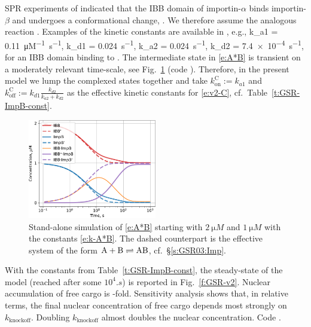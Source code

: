 \documentclass[12pt,notitlepage]{article}
\def\[#1\]{\begin{align}#1\end{align}}
\begin{document}
%

SPR experiments of \cite{Catimel2001}
indicated that
the IBB domain of importin-$\alpha$ 
binds importin-$\beta$
and undergoes a conformational change,
\[
	\label{e:A*B}
	.
\]
%
We therefore assume the analogous reaction
\[
	\label{e:Cargo*B}
	.
\]
%
%
Examples of the kinetic constants
are available in \cite[Table~I]{Catimel2001},
e.g.,
\[
	\label{e:k-A*B}
	k_{a1} = \SI{0.11}{\micro M^{-1} . s^{-1}},
	\quad
	k_{d1} = \SI{0.024}{s^{-1}},
	\qquad
	k_{a2} = \SI{0.024}{s^{-1}},
	\quad
	k_{d2} = \SI{7.4e-4}{s^{-1}},
\]
for an IBB domain binding to .
%
%
The intermediate state in \eqref{e:A*B} is transient
on a moderately relevant time-scale,
see Fig.~\ref{f:A*B}
(code \protect{}).
%
Therefore,
in the present model
we lump the complexed states together
and take
$k_\text{on}^\text{C} := k_{a1}$ and 
$k_\text{off}^\text{C} := k_{d1} \frac{k_{d2}}{k_{a2} + k_{d2}}$
as the effective kinetic constants 
for \eqref{e:v2-C}, cf.~Table~\ref{t:GSR-ImpB-const}.
%
%


\begin{figure}
\centering
\includegraphics[width=0.5\textwidth]{20210407-Rearrangement/python/timecourse}
\caption{%
	Stand-alone
	simulation of
	\eqref{e:A*B}
	starting with 
	$\SI{2}{\micro M}$ 
	and
	$\SI{1}{\micro M}$ 
	with
	the constants \eqref{e:k-A*B}.
	The dashed counterpart
	is the effective system 
	of the form
	$\ce{A} + \ce{B} \rightleftharpoons \ce{AB}$,
	cf.~\S\ref{s:GSR03:Imp}.
}
\label{f:A*B}
\end{figure}



%

With the constants from Table~\ref{t:GSR-ImpB-const},
the steady-state of the model
(reached after some $10^4 \si{. s}$)
is reported in Fig.~\ref{f:GSR-v2}.
%
Nuclear
accumulation of free cargo
is
\protect\unskip
-fold.
%
%
Sensitivity analysis shows
that, in relative terms,
the final nuclear concentration of free cargo
depends 
most strongly
on
$k_\text{knockoff}$.
%
Doubling $k_\text{knockoff}$ almost doubles 
the nuclear concentration.
%
%
%
Code .
\end{document}
